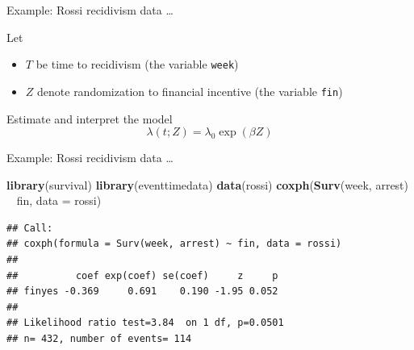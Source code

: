 \documentclass[ignorenonframetext,]{beamer}
\newenvironment{Shaded}{\begin{snugshade}}{\end{snugshade}}
\newcommand{\DataTypeTok}[1]{\textcolor[rgb]{0.13,0.29,0.53}{#1}}
\newcommand{\KeywordTok}[1]{\textcolor[rgb]{0.13,0.29,0.53}{\textbf{#1}}}
\newcommand{\NormalTok}[1]{#1}
\newcommand{\OperatorTok}[1]{\textcolor[rgb]{0.81,0.36,0.00}{\textbf{#1}}}
\newcommand{\StringTok}[1]{\textcolor[rgb]{0.31,0.60,0.02}{#1}}
\begin{document}
\begin{frame}{%
\protect\hypertarget{example-rossi-recidivism-data}{%
Example: Rossi recidivism data \ldots}}

Let

\begin{itemize}
\item
  \(T\) be time to recidivism (the variable \texttt{week})
\item
  \(Z\) denote randomization to financial incentive (the variable
  \texttt{fin})
\end{itemize}

Estimate and interpret the model \[
\lambda(t; Z) = \lambda_0 \exp(\beta Z)
\]

\end{frame}

\begin{frame}[fragile]{%
\protect\hypertarget{example-rossi-recidivism-data-1}{%
Example: Rossi recidivism data \ldots}}

\small

\begin{Shaded}
\begin{Highlighting}[]
\KeywordTok{library}\NormalTok{(survival)}
\KeywordTok{library}\NormalTok{(eventtimedata)}
\KeywordTok{data}\NormalTok{(rossi)}
\KeywordTok{coxph}\NormalTok{(}\KeywordTok{Surv}\NormalTok{(week, arrest) }\OperatorTok{~}\StringTok{ }\NormalTok{fin, }\DataTypeTok{data =}\NormalTok{ rossi)}
\end{Highlighting}
\end{Shaded}

\begin{verbatim}
## Call:
## coxph(formula = Surv(week, arrest) ~ fin, data = rossi)
## 
##          coef exp(coef) se(coef)     z     p
## finyes -0.369     0.691    0.190 -1.95 0.052
## 
## Likelihood ratio test=3.84  on 1 df, p=0.0501
## n= 432, number of events= 114
\end{verbatim}

\normalsize

\end{frame}
\end{document}
